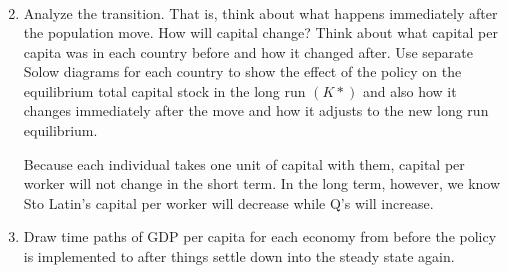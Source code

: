 \documentclass[11pt]{SelfArxOneColBMN}
\begin{document}
\begin{enumerate}[label=\alph*]
\begin{solution}
\begin{eqnarray*}
    \end{eqnarray*}
  \end{solution}
  \item Analyze the transition. That is, think about what happens immediately after the population move. How will capital change? Think about what capital per capita was in each country before and how it changed after. Use separate Solow diagrams for each country to show the effect of the policy on the equilibrium total capital stock in the long run $(K*)$ and also how it changes immediately after the move and how it adjusts to the new long run equilibrium.
  \begin{solution}
    Because each individual takes one unit of capital with them, capital per worker will not change in the short term. In the long term, however, we know Sto Latin's capital per worker will decrease while Q's will increase.    
  \end{solution}
  \item Draw time paths of GDP per capita for each economy from before the policy is implemented to after things settle down into the steady state again.
\end{enumerate}
\end{document}
